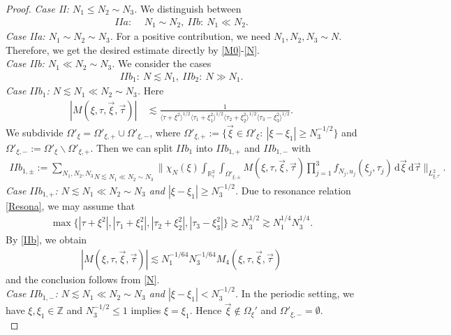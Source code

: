 \documentclass[reqno]{amsart}
\theoremstyle{Definitionl}
\theoremstyle{Definitionk}
\theoremstyle{definition}
\theoremstyle{Satzk}
\theoremstyle{Satzl}
\theoremstyle{Bemerkung}
\begin{document}
\begin{proof}
\emph{Case II: $N_1\le N_2\sim N_3$. }We distinguish between 
\begin{align*}
IIa:\ &\,N_1\sim N_2,\ IIb:\ N_1\ll N_2.
\end{align*}
\emph{Case IIa: $N_1\sim N_2\sim N_3$. }For a positive contribution, we need $N_1,N_2,N_3\sim N$. Therefore, we get the desired estimate directly by \eqref{M0}-\eqref{N}.\\[10pt]
\emph{Case IIb: $N_1\ll N_2\sim N_3$. }We consider the cases 
\begin{align*}
IIb_1:\ N\lesssim N_1,\ IIb_2:\ N\gg N_1.
\end{align*}
\emph{Case $IIb_1$: $N\lesssim N_1\ll N_2\sim N_3$. }Here
\begin{align}
|M(\xi,\tau,\vec\xi,\vec\tau)|
&\,\lesssim \frac{1}{\langle\tau+\xi^2\rangle^{1/2}\langle\tau_1+\xi_1^2\rangle^{1/2}\langle\tau_2+\xi_2^2\rangle^{1/2}\langle\tau_3-\xi_3^2\rangle^{1/2}}.\label{IIb}
\end{align}
We subdivide $\Omega'_\xi= \Omega'_{\xi,+}\cup\Omega'_{\xi,-}$, where $\Omega'_{\xi,+}:=\{\vec\xi\in\Omega'_\xi:\ |\xi-\xi_1|\ge N_3^{-1/2}\}$ and $\Omega'_{\xi,-}:=\Omega'_\xi\smallsetminus\Omega'_{\xi,+}$. Then we can split $IIb_1$ into $IIb_{1,+}$ and $IIb_{1,-}$ with
\begin{align*}
IIb_{1,\pm}:= \underset{N\lesssim N_1\ll N_2\sim N_3}{\sum_{N_1,N_2,N_3}}\Big\|\chi_N(\xi)\int_{\mathbb R^3_\tau}\int_{\Omega'_{\xi,\pm}}M(\xi,\tau,\vec\xi,\vec\tau)\prod_{j=1}^3f_{N_j,u_j}(\xi_j,\tau_j)\,\mathrm d\vec\xi\,\mathrm d\vec\tau\Big\|_{L^2_{\xi,\tau}}.
\end{align*}
\emph{Case $IIb_{1,+}$: $N\lesssim N_1\ll N_2\sim N_3$ and $|\xi-\xi_1|\ge N_3^{-1/2}$. }Due to resonance relation \eqref{Resona}, we may assume that
\begin{align*}
\max\{|\tau+\xi^2|,|\tau_1+\xi_1^2|,|\tau_2+\xi_2^2|,|\tau_3-\xi_3^2|\}\gtrsim N_3^{1/2}\gtrsim N_1^{1/4}N_3^{1/4}.
\end{align*}
By \eqref{IIb}, we obtain
\begin{align}
|M(\xi,\tau,\vec\xi,\vec\tau)|\lesssim N_1^{-1/64}N_3^{-1/64}M_4(\xi,\tau,\vec\xi,\vec\tau)\label{IIb1}
\end{align}
and the conclusion follows from \eqref{N}.\\[10pt]
\emph{Case $IIb_{1,-}$: $N\lesssim N_1\ll N_2\sim N_3$ and $|\xi-\xi_1|< N_3^{-1/2}$.} In the periodic setting, we have $\xi,\xi_1\in\mathbb Z$ and $N_3^{-1/2}\le1$ implies $\xi=\xi_1$. Hence $\vec\xi\notin\Omega_\xi'$ and $\Omega'_{\xi,-}=\emptyset$.\\[10pt] 

\end{proof}
\end{document}
